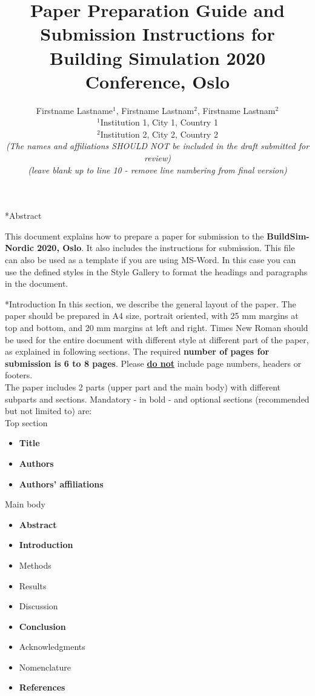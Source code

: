 \documentclass[twocolumn, a4paper,10pt]{article}
\title{%
Paper Preparation Guide and Submission Instructions for\\																								%
\vspace{4pt}
Building Simulation 2020 Conference, Oslo} 																																		%
\author{
Firstname Lastname$^1$, Firstname Lastnam$^2$, Firstname Lastnam$^2$\\ 																											%
$^1$Institution 1, City 1, Country 1\\ 																																	%
$^2$Institution 2, City 2, Country 2\\ 																																	%
\textit{(The names and affiliations SHOULD NOT be included in the draft submitted for review)}\\ 			  %
\textit{(leave blank up to line 10 - remove line numbering from final version)}\\ 											%
\phantom{Line 9}} 																																											%
\date{\vspace{-0.5cm}}	%
\makeatletter
\renewcommand\section{\@startsection{section}{1}{\z@}{3pt}{3pt}{\normalfont\large\bfseries}}
\makeatother
\begin{document}
\maketitle

\section*{Abstract}	%
\addtocounter{section}{1}
This document explains how to prepare a paper for submission to the \textbf{BuildSim-Nordic 2020, Oslo}. It also includes the instructions for submission. This file can also be used as a template if you are using MS-Word. In this case you can use the defined styles in the Style Gallery to format the headings and paragraphs in the document.

\section*{Introduction}
In this section, we describe the general layout of the paper. The paper should be prepared in A4 size, portrait oriented, with 25 mm margins at top and bottom, and 20 mm margins at left and right. Times New Roman should be used for the entire document with different style at different part of the paper, as explained in following sections. The required \textbf{number of pages for submission is 6 to 8 pages}. Please \textbf{\underline{do not}} include page numbers, headers or footers.\\
The paper includes 2 parts (upper part and the main body) with different subparts and sections. Mandatory - in bold - and optional sections (recommended but not limited to)  are:\\
Top section
\begin{itemize}
\item \textbf{Title}
\item \textbf{Authors}
\item \textbf{Authors' affiliations}
\end{itemize}
Main body
\begin{itemize}
\item \textbf{Abstract}
\item \textbf{Introduction}
\item Methods
\item Results
\item Discussion
\item \textbf{Conclusion}
\item Acknowledgments
\item Nomenclature
\item \textbf{References}
\end{itemize}
\end{document}
